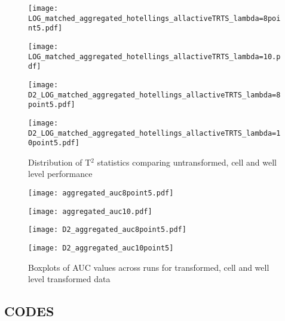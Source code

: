 \documentclass[11pt]{article}
\begin{document}

\clearpage
\begin{figure}[ht!]
\begin{minipage}{.495\textwidth}
\centering
\texttt{[image: LOG\_matched\_aggregated\_hotellings\_allactiveTRTS\_lambda=8point5.pdf]}
\end{minipage}
\begin{minipage}{.495\textwidth}
\centering
\texttt{[image: LOG\_matched\_aggregated\_hotellings\_allactiveTRTS\_lambda=10.pdf]}
\end{minipage}

\begin{minipage}{.495\textwidth}
\centering
\texttt{[image: D2\_LOG\_matched\_aggregated\_hotellings\_allactiveTRTS\_lambda=8point5.pdf]}
\end{minipage}
\begin{minipage}{.495\textwidth}
\centering
\texttt{[image: D2\_LOG\_matched\_aggregated\_hotellings\_allactiveTRTS\_lambda=10point5.pdf]}
\end{minipage}
\caption{Distribution of T$^2$ statistics comparing untransformed, cell and well level performance}
\label{distt10501_agg_poor}
\end{figure}

\clearpage
\begin{figure}[ht!] %
\centering
\begin{minipage}{.495\textwidth}
\centering
\texttt{[image: aggregated\_auc8point5.pdf]}
\end{minipage}
\begin{minipage}{.495\textwidth}
\centering
\texttt{[image: aggregated\_auc10.pdf]}
\end{minipage}

\begin{minipage}{.495\textwidth}
\centering
\texttt{[image: D2\_aggregated\_auc8point5.pdf]}
\end{minipage}
\begin{minipage}{.495\textwidth}
\centering
\texttt{[image: D2\_aggregated\_auc10point5]}
\end{minipage}
\caption{Boxplots of AUC values across runs for transformed, cell and well level transformed data}
\label{agg_allbox_poor}
\end{figure}

\clearpage
\subsection{CODES}
\begin{verbatim}

\end{verbatim}
\end{document}
